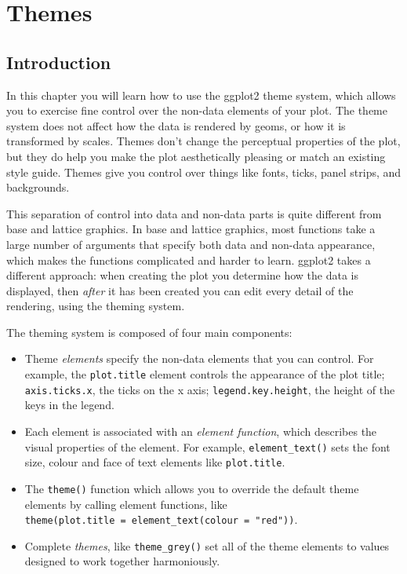 \chapter{Themes}\label{cha:polishing}

\section{Introduction}

In this chapter you will learn how to use the ggplot2 theme system,
which allows you to exercise fine control over the non-data elements of
your plot. The theme system does not affect how the data is rendered by
geoms, or how it is transformed by scales. Themes don't change the
perceptual properties of the plot, but they do help you make the plot
aesthetically pleasing or match an existing style guide. Themes give you
control over things like fonts, ticks, panel strips, and backgrounds.

This separation of control into data and non-data parts is quite
different from base and lattice graphics. In base and lattice graphics,
most functions take a large number of arguments that specify both data
and non-data appearance, which makes the functions complicated and
harder to learn. ggplot2 takes a different approach: when creating the
plot you determine how the data is displayed, then \emph{after} it has
been created you can edit every detail of the rendering, using the
theming system.

The theming system is composed of four main components:

\begin{itemize}
\item
  Theme \emph{elements} specify the non-data elements that you can
  control. For example, the \texttt{plot.title} element controls the
  appearance of the plot title; \texttt{axis.ticks.x}, the ticks on the
  x axis; \texttt{legend.key.height}, the height of the keys in the
  legend.
\item
  Each element is associated with an \emph{element function}, which
  describes the visual properties of the element. For example,
  \texttt{element\_text()} sets the font size, colour and face of text
  elements like \texttt{plot.title}.
\item
  The \texttt{theme()} function which allows you to override the default
  theme elements by calling element functions, like
  \texttt{theme(plot.title\ =\ element\_text(colour\ =\ "red"))}.
\item
  Complete \emph{themes}, like \texttt{theme\_grey()} set all of the
  theme elements to values designed to work together harmoniously.
\end{itemize}

